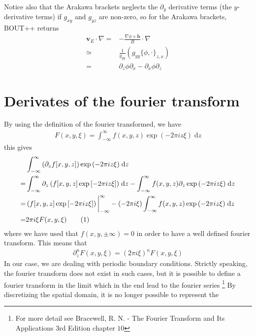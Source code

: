 \documentclass[12pt]{article}
\newcommand{\defi}[4]{\int_{#1}^{#2} {#3} \; \text{d} {#4}} %
\def\L{\left}
\def\R{\right}
\newcommand{\ve}[1]{\ensuremath{\boldsymbol{#1}}}
\newcommand\numberthis{\addtocounter{equation}{1}\tag{\theequation}}
\begin{document}
Notice also that the Arakawa brackets neglects the $\partial_y$ derivative
terms (the $y$-derivative terms) if $g_{xy}$ and $g_{yz}$ are non-zero,
so for the Arakawa brackets, BOUT++ returns
%
\begin{align*}
    \ve{v}_E\cdot\nabla =& -\frac{\nabla\phi\times\ve{b}}{B}\cdot\nabla\\
    \simeq& \frac{1}{g_{yy}} \L( g_{yy}\{\phi, \cdot\}_{z,x} \R)\\
    =& \partial_z\phi\partial_x - \partial_x\phi\partial_z
\end{align*}
%





\section{Derivates of the fourier transform}
%
\label{sec:deriv_of_FT}
By using the definition of the fourier transformed, we have
%
\begin{align*}
    F(x,y,\xi) = \defi{-\infty}{\infty}{f(x,y,z)\exp\L(-2\pi iz\xi\R)}{z}
\end{align*}
%
this gives
%
\begin{align*}
    &\defi{-\infty}{\infty}{\L(\partial_zf[x,y,z]\R)\exp\L(-2\pi iz\xi\R)}{z}\\
%
    =& \defi{-\infty}{\infty}{\partial_z\L(f[x,y,z]\exp\L[-2\pi iz\xi\R]\R)}{z}
    - \defi{-\infty}{\infty}{f(x,y,z)\partial_z\exp\L(-2\pi iz\xi\R)}{z}\\
%
    =& \L(f[x,y,z]\exp\L[-2\pi iz\xi\R]\R)\bigg|_{-\infty}^{\infty} - \L(-2\pi
    i\xi\R)\defi{-\infty}{\infty}{f(x,y,z)\exp\L(-2\pi iz\xi\R)}{z}\\
%
    =& 2\pi i\xi F(x,y,\xi) \numberthis
    \label{eq:f_derivative}
\end{align*}
%
where we have used that $f(x,y,\pm\infty)=0$ in order to have a well defined
fourier transform. This means that
%
\begin{align*}
    \partial_z^n F(x,y,\xi) = (2\pi i \xi)^n F(x,y,\xi)
\end{align*}
%
In our case, we are dealing with periodic boundary conditions. Strictly
speaking, the fourier transform does not exist in such cases, but it is
possible to define a fourier transform in the limit which in the end lead to
the fourier series
%
\footnote{For more detail see Bracewell, R. N. - The Fourier Transform and Its
Applications 3rd Edition chapter $10$}
%
By discretizing the spatial domain, it is no longer possible to represent the
\end{document}
